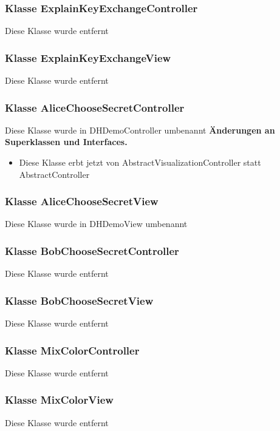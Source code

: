 \documentclass{article}
\begin{document}
	\subsubsection{Klasse ExplainKeyExchangeController}
    Diese Klasse wurde entfernt

	\subsubsection{Klasse ExplainKeyExchangeView}
    Diese Klasse wurde entfernt

	\subsubsection{Klasse AliceChooseSecretController}
    Diese Klasse wurde in DHDemoController umbenannt
	    \textbf{Änderungen an Superklassen und Interfaces.}\newline
	   \begin{itemize}
            \item Diese Klasse erbt jetzt von AbstractVisualizationController statt AbstractController\newline
           \end{itemize}

	\subsubsection{Klasse AliceChooseSecretView}
    Diese Klasse wurde in DHDemoView umbenannt

	\subsubsection{Klasse BobChooseSecretController}
    Diese Klasse wurde entfernt

	\subsubsection{Klasse BobChooseSecretView}
    Diese Klasse wurde entfernt

	\subsubsection{Klasse MixColorController}
    Diese Klasse wurde entfernt

	\subsubsection{Klasse MixColorView}
    Diese Klasse wurde entfernt
\end{document}
